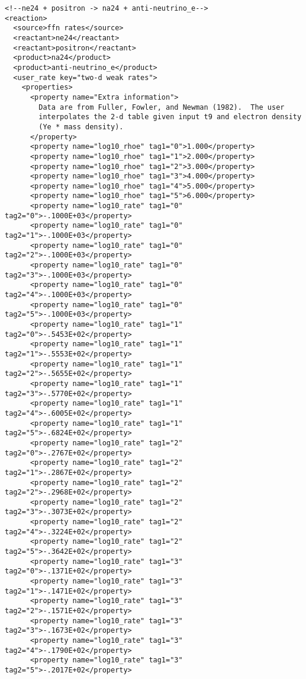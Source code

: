 \documentclass{article}    %
\begin{document}
\begin{verbatim}
<!--ne24 + positron -> na24 + anti-neutrino_e-->
<reaction>
  <source>ffn rates</source>
  <reactant>ne24</reactant>
  <reactant>positron</reactant>
  <product>na24</product>
  <product>anti-neutrino_e</product>
  <user_rate key="two-d weak rates">
    <properties>
      <property name="Extra information">
        Data are from Fuller, Fowler, and Newman (1982).  The user
        interpolates the 2-d table given input t9 and electron density
        (Ye * mass density).
      </property>
      <property name="log10_rhoe" tag1="0">1.000</property>
      <property name="log10_rhoe" tag1="1">2.000</property>
      <property name="log10_rhoe" tag1="2">3.000</property>
      <property name="log10_rhoe" tag1="3">4.000</property>
      <property name="log10_rhoe" tag1="4">5.000</property>
      <property name="log10_rhoe" tag1="5">6.000</property>
      <property name="log10_rate" tag1="0" tag2="0">-.1000E+03</property>
      <property name="log10_rate" tag1="0" tag2="1">-.1000E+03</property>
      <property name="log10_rate" tag1="0" tag2="2">-.1000E+03</property>
      <property name="log10_rate" tag1="0" tag2="3">-.1000E+03</property>
      <property name="log10_rate" tag1="0" tag2="4">-.1000E+03</property>
      <property name="log10_rate" tag1="0" tag2="5">-.1000E+03</property>
      <property name="log10_rate" tag1="1" tag2="0">-.5453E+02</property>
      <property name="log10_rate" tag1="1" tag2="1">-.5553E+02</property>
      <property name="log10_rate" tag1="1" tag2="2">-.5655E+02</property>
      <property name="log10_rate" tag1="1" tag2="3">-.5770E+02</property>
      <property name="log10_rate" tag1="1" tag2="4">-.6005E+02</property>
      <property name="log10_rate" tag1="1" tag2="5">-.6824E+02</property>
      <property name="log10_rate" tag1="2" tag2="0">-.2767E+02</property>
      <property name="log10_rate" tag1="2" tag2="1">-.2867E+02</property>
      <property name="log10_rate" tag1="2" tag2="2">-.2968E+02</property>
      <property name="log10_rate" tag1="2" tag2="3">-.3073E+02</property>
      <property name="log10_rate" tag1="2" tag2="4">-.3224E+02</property>
      <property name="log10_rate" tag1="2" tag2="5">-.3642E+02</property>
      <property name="log10_rate" tag1="3" tag2="0">-.1371E+02</property>
      <property name="log10_rate" tag1="3" tag2="1">-.1471E+02</property>
      <property name="log10_rate" tag1="3" tag2="2">-.1571E+02</property>
      <property name="log10_rate" tag1="3" tag2="3">-.1673E+02</property>
      <property name="log10_rate" tag1="3" tag2="4">-.1790E+02</property>
      <property name="log10_rate" tag1="3" tag2="5">-.2017E+02</property>

\end{verbatim}
\end{document}
